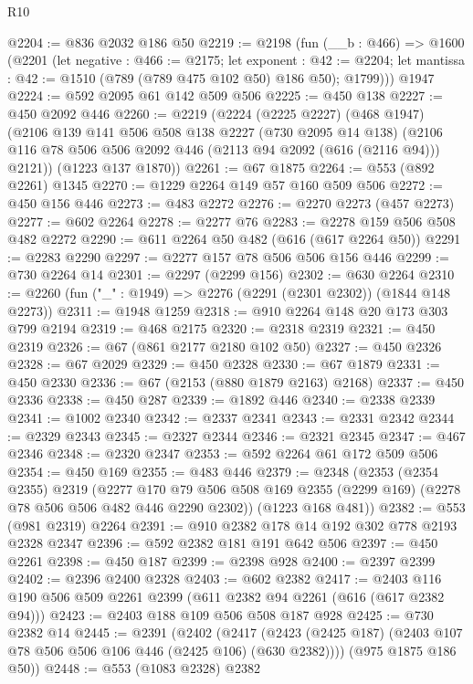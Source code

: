 \begin{lexlean}{R10}
\begin{coremodule}
@2204 := @836 @2032 @186 @50
@2219 := @2198
    (fun (__b : @466) =>
    @1600
      (@2201
        (let negative : @466 := @2175;
        let exponent : @42 := @2204;
        let mantissa : @42 := @1510 (@789 (@789 @475 @102 @50) @186 @50); @1799)))
    @1947
@2224 := @592 @2095 @61 @142 @509 @506
@2225 := @450 @138
@2227 := @450 @2092 @446
@2260 := @2219
    (@2224
      (@2225 @2227)
      (@468 @1947)
      (@2106
        @139
        @141
        @506
        @508
        @138
        @2227
        (@730 @2095 @14 @138)
        (@2106 @116 @78 @506 @506 @2092 @446 (@2113 @94 @2092 (@616 (@2116 @94))) @2121))
      (@1223 @137 @1870))
@2261 := @67 @1875
@2264 := @553 (@892 @2261) @1345
@2270 := @1229 @2264 @149 @57 @160 @509 @506
@2272 := @450 @156 @446
@2273 := @483 @2272
@2276 := @2270 @2273 (@457 @2273)
@2277 := @602 @2264
@2278 := @2277 @76
@2283 := @2278 @159 @506 @508 @482 @2272
@2290 := @611 @2264 @50 @482 (@616 (@617 @2264 @50))
@2291 := @2283 @2290
@2297 := @2277 @157 @78 @506 @506 @156 @446
@2299 := @730 @2264 @14
@2301 := @2297 (@2299 @156)
@2302 := @630 @2264
@2310 := @2260 (fun ("_" : @1949) => @2276 (@2291 (@2301 @2302)) (@1844 @148 @2273))
@2311 := @1948 @1259
@2318 := @910 @2264 @148 @20 @173 @303 @799 @2194
@2319 := @468 @2175
@2320 := @2318 @2319
@2321 := @450 @2319
@2326 := @67 (@861 @2177 @2180 @102 @50)
@2327 := @450 @2326
@2328 := @67 @2029
@2329 := @450 @2328
@2330 := @67 @1879
@2331 := @450 @2330
@2336 := @67 (@2153 (@880 @1879 @2163) @2168)
@2337 := @450 @2336
@2338 := @450 @287
@2339 := @1892 @446
@2340 := @2338 @2339
@2341 := @1002 @2340
@2342 := @2337 @2341
@2343 := @2331 @2342
@2344 := @2329 @2343
@2345 := @2327 @2344
@2346 := @2321 @2345
@2347 := @467 @2346
@2348 := @2320 @2347
@2353 := @592 @2264 @61 @172 @509 @506
@2354 := @450 @169
@2355 := @483 @446
@2379 := @2348
    (@2353
      (@2354 @2355)
      @2319
      (@2277 @170 @79 @506 @508 @169 @2355 (@2299 @169) (@2278 @78 @506 @506 @482 @446 @2290 @2302))
      (@1223 @168 @481))
@2382 := @553 (@981 @2319) @2264
@2391 := @910 @2382 @178 @14 @192 @302 @778 @2193 @2328 @2347
@2396 := @592 @2382 @181 @191 @642 @506
@2397 := @450 @2261
@2398 := @450 @187
@2399 := @2398 @928
@2400 := @2397 @2399
@2402 := @2396 @2400 @2328
@2403 := @602 @2382
@2417 := @2403 @116 @190 @506 @509 @2261 @2399 (@611 @2382 @94 @2261 (@616 (@617 @2382 @94)))
@2423 := @2403 @188 @109 @506 @508 @187 @928
@2425 := @730 @2382 @14
@2445 := @2391
    (@2402
      (@2417 (@2423 (@2425 @187) (@2403 @107 @78 @506 @506 @106 @446 (@2425 @106) (@630 @2382))))
      (@975 @1875 @186 @50))
@2448 := @553 (@1083 @2328) @2382

\end{coremodule}
\end{lexlean}
